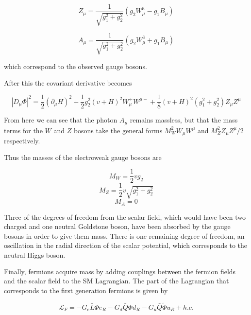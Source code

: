 		\begin{equation}
		Z_{\mu} = \frac{1}{\sqrt{g_{1}^{2}+g_{2}^{2}}}(g_{2}W_{\mu}^{3}-g_{1}B_{\mu})
		\end{equation}

		\begin{equation}
		A_{\mu} = \frac{1}{\sqrt{g_{1}^{2}+g_{2}^{2}}}(g_{2}W_{\mu}^{3}+g_{1}B_{\mu})
		\end{equation}

		which correspond to the observed gauge bosons. 

	After this the covariant derivative becomes

		\begin{equation}
		|D_{\mu}\Phi|^{2} = \frac{1}{2}(\partial_{\mu}H)^{2}+\frac{1}{2}g_{2}^{2}(v+H)^{2}W_{\mu}^{+}W^{\mu-}+\frac{1}{8}(v+H)^{2}(g_{1}^{2}+g_{2}^{2})Z_{\mu}Z^{\mu}
		\end{equation}

	From here we can see that the photon $A_{\mu}$ remains massless, but that the mass terms for the $W$ and $Z$ bosons take the general forms $M_{W}^{2}W_{\mu}W^{\mu}$ and $M_{Z}^{2}Z_{\mu}Z^{\mu}/2$ respectively.

	Thus the masses of the electroweak gauge bosons are

		\begin{equation}
		M_{W} = \frac{1}{2}vg_{2}
		\end{equation}
		\begin{equation}
		M_{Z}= \frac{1}{2}v\sqrt{g_{1}^{2}+g_{2}^{2}}
		\end{equation}
		\begin{equation}
		M_{A} = 0
		\end{equation}

	Three of the degrees of freedom from the scalar field, which would have been two charged and one neutral Goldstone boson, have been absorbed by the gauge bosons in order to give them mass. There is one remaining degree of freedom, an oscillation in the radial direction of the scalar potential, which corresponds to the neutral Higgs boson.

	Finally, fermions acquire mass by adding couplings between the fermion fields and the scalar field to the SM Lagrangian. The part of the Lagrangian that corresponds to the first generation fermions is given by

		\begin{equation}
		\mathcal{L}_{F} = -G_{e}\bar{L}\Phi e_{R} - G_{d}\bar{Q}\Phi d_{R} - G_{u}\bar{Q}\tilde{\Phi}u_{R}+h.c.
		\end{equation}

